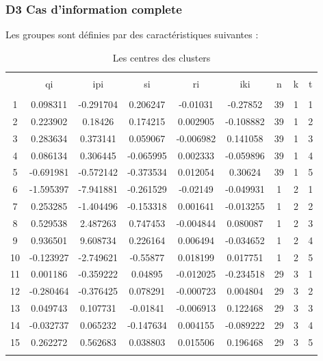 \documentclass[11pt,]{article}
\begin{document}
\newpage

\hypertarget{d3-cas-dinformation-complete}{%
\subsubsection{D3 Cas d'information
complete}\label{d3-cas-dinformation-complete}}

Les groupes sont définies par des caractéristiques suivantes :

\FloatBarrier

\begin{table}[!htbp] \centering 
  \caption{Les centres des clusters} 
  \label{} 
\begin{tabular}{@{\extracolsep{5pt}} ccccccccc} 
\\[-1.8ex]\hline 
\hline \\[-1.8ex] 
 & qi & ipi & si & ri & iki & n & k & t \\ 
\hline \\[-1.8ex] 
1 & 0.098311 & -0.291704 & 0.206247 & -0.01031 & -0.27852 & 39 & 1 & 1 \\ 
2 & 0.223902 & 0.18426 & 0.174215 & 0.002905 & -0.108882 & 39 & 1 & 2 \\ 
3 & 0.283634 & 0.373141 & 0.059067 & -0.006982 & 0.141058 & 39 & 1 & 3 \\ 
4 & 0.086134 & 0.306445 & -0.065995 & 0.002333 & -0.059896 & 39 & 1 & 4 \\ 
5 & -0.691981 & -0.572142 & -0.373534 & 0.012054 & 0.30624 & 39 & 1 & 5 \\ 
6 & -1.595397 & -7.941881 & -0.261529 & -0.02149 & -0.049931 & 1 & 2 & 1 \\ 
7 & 0.253285 & -1.404496 & -0.153318 & 0.001641 & -0.013255 & 1 & 2 & 2 \\ 
8 & 0.529538 & 2.487263 & 0.747453 & -0.004844 & 0.080087 & 1 & 2 & 3 \\ 
9 & 0.936501 & 9.608734 & 0.226164 & 0.006494 & -0.034652 & 1 & 2 & 4 \\ 
10 & -0.123927 & -2.749621 & -0.55877 & 0.018199 & 0.017751 & 1 & 2 & 5 \\ 
11 & 0.001186 & -0.359222 & 0.04895 & -0.012025 & -0.234518 & 29 & 3 & 1 \\ 
12 & -0.280464 & -0.376425 & 0.078291 & -0.000723 & 0.004804 & 29 & 3 & 2 \\ 
13 & 0.049743 & 0.107731 & -0.01841 & -0.006913 & 0.122468 & 29 & 3 & 3 \\ 
14 & -0.032737 & 0.065232 & -0.147634 & 0.004155 & -0.089222 & 29 & 3 & 4 \\ 
15 & 0.262272 & 0.562683 & 0.038803 & 0.015506 & 0.196468 & 29 & 3 & 5 \\ 
\hline \\[-1.8ex] 
\end{tabular} 
\end{table}
\end{document}
